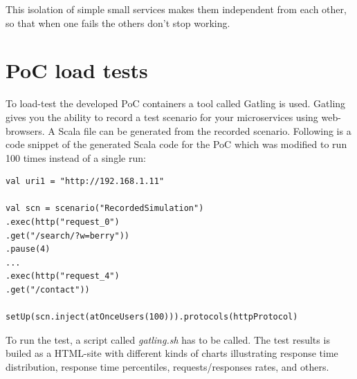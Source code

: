This isolation of simple small services makes them independent from each other, so that when one fails the others don’t stop working.   

\section{PoC load tests}
To load-test the developed PoC containers a tool called Gatling is used. Gatling gives you the ability to record a test scenario for your microservices using web-browsers. A Scala file can be generated from the recorded scenario. Following is a code snippet of the generated Scala code for the PoC which was modified to run 100 times instead of a single run: \begin{lstlisting}[frame=single, ]
val uri1 = "http://192.168.1.11"

val scn = scenario("RecordedSimulation")
.exec(http("request_0")
.get("/search/?w=berry"))
.pause(4)
...
.exec(http("request_4")
.get("/contact"))

setUp(scn.inject(atOnceUsers(100))).protocols(httpProtocol)
\end{lstlisting}

To run the test, a script called \textit{gatling.sh} has to be called. The test results is builed as a HTML-site with different kinds of charts illustrating response time distribution, response time percentiles, requests/responses rates, and others.